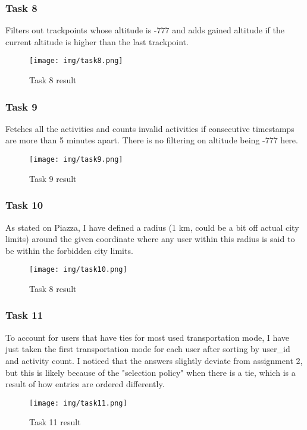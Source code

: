 \documentclass[12pt, titlepage]{report}
\begin{document}
\subsubsection*{Task 8}
Filters out trackpoints whose altitude is -777 and adds gained altitude if the current altitude is higher than the last trackpoint.
\begin{figure}[H]
    \centering
    \texttt{[image: img/task8.png]}
    \caption{Task 8 result}
    \label{fig:my_label}
\end{figure}

\subsubsection*{Task 9}
Fetches all the activities and counts invalid activities if consecutive timestamps are more than 5 minutes apart. There is no filtering on altitude being -777 here.
\begin{figure}[H]
    \centering
    \texttt{[image: img/task9.png]}
    \caption{Task 9 result}
    \label{fig:my_label}
\end{figure}

\subsubsection*{Task 10}
As stated on Piazza, I have defined a radius (1 km, could be a bit off actual city limits) around the given coordinate where any user within this radius is said to be within the forbidden city limits.
\begin{figure}[H]
    \centering
    \texttt{[image: img/task10.png]}
    \caption{Task 8 result}
    \label{fig:my_label}
\end{figure}

\subsubsection*{Task 11}
To account for users that have ties for most used transportation mode, I have just taken the first transportation mode for each user after sorting by user\_id and activity count. I noticed that the answers slightly deviate from assignment 2, but this is likely because of the "selection policy" when there is a tie, which is a result of how entries are ordered differently.
\begin{figure}[H]
    \centering
    \texttt{[image: img/task11.png]}
    \caption{Task 11 result}
    \label{fig:my_label}
\end{figure}
\end{document}
